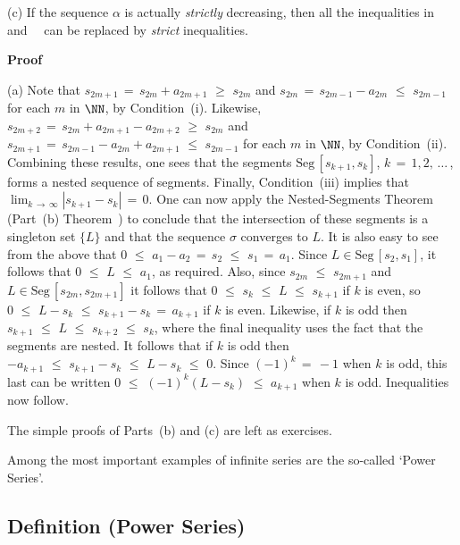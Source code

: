         (c) If the sequence ${\alpha}$ is actually {\em strictly} decreasing, then all the inequalities in~ and~~ can be replaced by {\em strict} inequalities.

\V

        {\bf Proof}

        (a) Note that $s_{2m+1} \,=\, s_{2m}+a_{2m+1}\,\,{\geq}\,\,s_{2m}$ and $s_{2m} \,=\, s_{2m-1}-a_{2m}\,\,{\leq}\,\,s_{2m-1}$ for each $m$ in ${\NN}$, by Condition~(i).
    Likewise, $s_{2m+2} \,=\, s_{2m} + a_{2m+1} - a_{2m+2}\,\,{\geq}\,\,s_{2m}$ and $s_{2m+1} \,=\, s_{2m-1} - a_{2m} + a_{2m+1}\,\,{\leq}\,\,s_{2m-1}$ for each $m$ in ${\NN}$, by Condition~(ii).
    Combining these results, one sees that the segments $\mbox{Seg}\,[s_{k+1},s_{k}]$, $k \,=\, 1,2,\,{\ldots}\,$, forms a nested sequence of segments.
    Finally, Condition~(iii) implies that $\lim_{k \,{\rightarrow}\, {\infty}} |s_{k+1}-s_{k}| \,=\, 0$.
    One can now apply the Nested-Segments Theorem (Part~(b) Theorem~) to conclude that the intersection of these segments is a singleton set $\{L\}$ and that the sequence ${\sigma}$ converges to $L$.
    It is also easy to see from the above that $0\,\,{\leq}\,\,a_{1}-a_{2} \,=\, s_{2}\,\,{\leq}\,\,s_{1} \,=\, a_{1}$.
    Since $L{\in}\mbox{Seg}\,[s_{2},s_{1}]$, it follows that $0\,\,{\leq}\,\,L\,\,{\leq}\,\,a_{1}$, as required.
    Also, since $s_{2m}\,\,{\leq}\,\,s_{2m+1}$ and $L{\in}\mbox{Seg}\,[s_{2m},s_{2m+1}]$ it follows that $0\,\,{\leq}\,\,s_{k}\,\,{\leq}\,\,L\,\,{\leq}\,\,s_{k+1}$
    if $k$ is even, so $0\,\,{\leq}\,\,L-s_{k}\,\,{\leq}\,\,s_{k+1}-s_{k} \,=\, a_{k+1}$ if $k$ is even.
    Likewise, if $k$ is odd then $s_{k+1}\,\,{\leq}\,\,L\,\,{\leq}\,\,s_{k+2}\,\,{\leq}\,\,s_{k}$, where the final inequality uses the fact that the segments are nested.
    It follows that if $k$ is odd then $-a_{k+1}\,\,{\leq}\,\,s_{k+1}-s_{k}\,\,{\leq}\,\,L-s_{k}\,\,{\leq}\,\,0$. Since $(-1)^{k} \,=\, -1$ when $k$ is odd, this last can be written $0\,\,{\leq}\,\,(-1)^{k}(L-s_{k})\,\,{\leq}\,\,a_{k+1}$ when $k$ is odd. Inequalities~ now follow.

\V

        The simple proofs of Parts~(b) and (c) are left as exercises.



\V
\V

        Among the most important examples of infinite series are the so-called `Power Series'.


        \subsection{\small{{\bf Definition}} (Power Series)}
        \label{DefG30.130}

